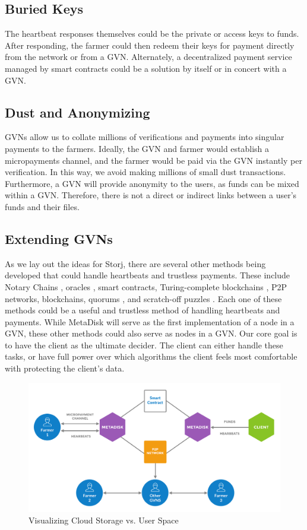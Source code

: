\documentclass[a4paper,10pt]{article}
\begin{document}
\subsection{Buried Keys}
The heartbeat responses themselves could be the private or access keys to funds. After responding, the farmer could then redeem their keys for payment directly from the network or from a GVN. Alternately, a decentralized payment service managed by smart contracts could be a solution by itself or in concert with a GVN. 

\subsection{Dust and Anonymizing}
GVNs allow us to collate millions of verifications and payments into singular payments to the farmers. Ideally, the GVN and farmer would establish a micropayments channel, and the farmer would be paid via the GVN instantly per verification. In this way, we avoid making millions of small dust transactions. Furthermore, a GVN will provide anonymity to the users, as funds can be mixed within a GVN. Therefore, there is not a direct or indirect links between a user’s funds and their files.

\subsection{Extending GVNs}
As we lay out the ideas for Storj, there are several other methods being developed that could handle heartbeats and trustless payments. These include Notary Chains \cite{7}, oracles \cite{21}, smart contracts, Turing-complete blockchains \cite{22}, P2P networks, blockchains, quorums \cite{20}, and scratch-off puzzles \cite{23}. Each one of these methods could be a useful and trustless method of handling heartbeats and payments. While MetaDisk \cite{1} will serve as the first implementation of a node in a GVN, these other methods could also serve as nodes in a GVN. Our core goal is to have the client as the ultimate decider. The client can either handle these tasks, or have full power over which algorithms the client feels most comfortable with protecting the client’s data. 

\begin{figure}[h!]
\centering
\includegraphics[width=\linewidth]{10}
\caption{Visualizing Cloud Storage vs. User Space }
\end{figure}
\end{document}
